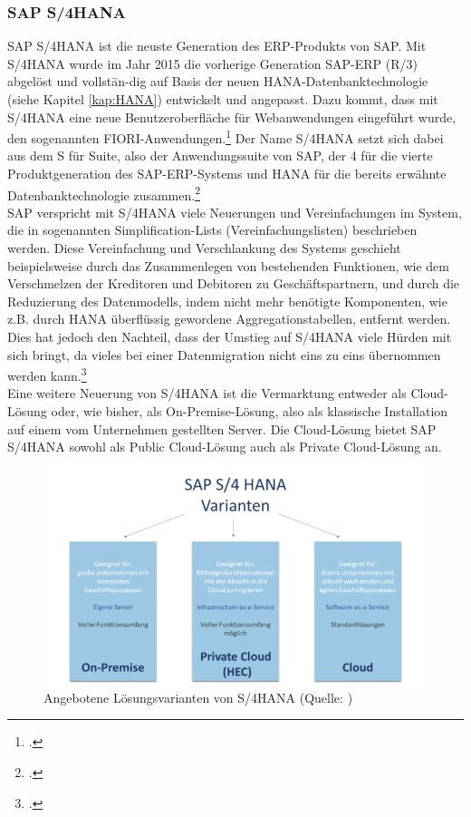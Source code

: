 \subsubsection{SAP S/4HANA}
\label{kap:S4HANA} 
SAP S/4HANA ist die neuste Generation des ERP-Produkts von SAP. Mit S/4HANA wurde im Jahr 2015 die vorherige Generation SAP-ERP (R/3) abgelöst und vollstän-dig auf Basis der neuen HANA-Datenbanktechnologie (siehe Kapitel \ref{kap:HANA}) entwickelt und angepasst. Dazu kommt, dass mit S/4HANA eine neue Benutzeroberfläche für Webanwendungen eingeführt wurde, den sogenannten FIORI-Anwendungen.\footcite[Vgl.][]{was-hana} Der Name \glqq{}S/4HANA\grqq{} setzt sich dabei aus dem \glqq{}S\grqq{} für \glqq{}Suite\grqq{}, also der Anwendungssuite von SAP, der \glqq{}4\grqq{} für die vierte Produktgeneration des SAP-ERP-Systems und \glqq{}HANA\grqq{} für die bereits erwähnte Datenbanktechnologie zusammen.\footcite[Vgl.][]{rz10-s4hana}\\SAP verspricht mit S/4HANA viele Neuerungen und Vereinfachungen im System, die in sogenannten \glqq{}Simplification-Lists\grqq{} (Vereinfachungslisten) beschrieben werden. Diese Vereinfachung und Verschlankung des Systems geschieht beispielsweise durch das Zusammenlegen von bestehenden Funktionen, wie dem Verschmelzen der Kreditoren und Debitoren zu Geschäftspartnern, und durch die Reduzierung des Datenmodells, indem nicht mehr benötigte Komponenten, wie z.B. durch HANA überflüssig gewordene Aggregationstabellen, entfernt werden. Dies hat jedoch den Nachteil, dass der Umstieg auf S/4HANA viele Hürden mit sich bringt, da vieles bei einer Datenmigration nicht eins zu eins übernommen werden kann.\footcite[Vgl.][]{ibsolution}\\Eine weitere Neuerung von S/4HANA ist die Vermarktung entweder als Cloud-Lösung oder, wie bisher, als On-Premise-Lösung, also als klassische Installation auf einem vom Unternehmen gestellten Server. Die Cloud-Lösung bietet SAP S/4HANA sowohl als \glqq{}Public Cloud\grqq{}-Lösung auch als \glqq{}Private Cloud\grqq{}-Lösung an.
\begin{figure}[h]
    \centering
    \includegraphics[scale=1.3]{./Bilder/HANA-Varianten.png}
    \caption[S/4HANA Lösungen]{Angebotene Lösungsvarianten von S/4HANA (Quelle: \cite[][]{rz10-s4hana})}
\end{figure}
